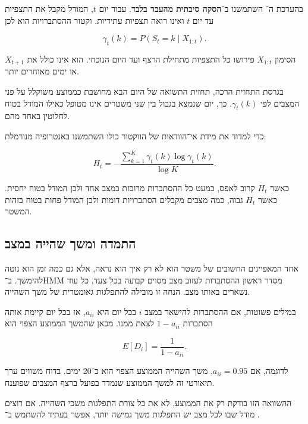 בהערכת ה־ השתמשנו ב־\textbf{הסקה סיבתית מהעבר בלבד}. עבור יום \(t\), המודל מקבל את התצפיות עד יום \(t\) ואינו רואה תצפיות עתידיות. וקטור ההסתברויות הוא לכן

\begin{equation}
\gamma_t(k)=P(S_t=k\mid X_{1:t}).
\end{equation}

הסימון \(X_{1:t}\) פירושו כל התצפיות מתחילת הרצף ועד היום הנוכחי. הוא אינו כולל את \(X_{t+1}\) או ימים מאוחרים יותר.

בגרסת התחזית הרכה, תחזית התשואה של היום הבא מחושבת כממוצע משוקלל על פני המצבים לפי \(\gamma_t(k)\). כך, יום שנמצא בגבול בין שני משטרים אינו מטופל כאילו המודל בטוח לחלוטין באחד מהם.

כדי למדוד את מידת אי־הוודאות של הווקטור כולו השתמשנו באנטרופיה מנורמלת:

\begin{equation}
H_t=-\frac{\sum_{k=1}^{K}\gamma_t(k)\log\gamma_t(k)}{\log K}.
\end{equation}

כאשר \(H_t\) קרוב לאפס, כמעט כל ההסתברות מרוכזת במצב אחד ולכן המודל בטוח יחסית. כאשר \(H_t\) גבוה, כמה מצבים מקבלים הסתברויות דומות ולכן המודל פחות בטוח בזהות המשטר.

\subsection{התמדה ומשך שהייה במצב}

אחד המאפיינים החשובים של משטר הוא לא רק איך הוא נראה, אלא גם כמה זמן הוא נוטה להימשך. ב־HMM מסדר ראשון ההסתברות לעזוב מצב מסוים קבועה בכל צעד, כל עוד נשארים באותו מצב. הנחה זו מובילה להתפלגות גאומטרית של משך השהייה.

במילים פשוטות, אם ההסתברות להישאר במצב \(i\) בכל יום היא \(a_{ii}\), אז בכל יום קיימת אותה הסתברות \(1-a_{ii}\) לצאת ממנו. מכאן שהמשך הממוצע הצפוי הוא

\begin{equation}
E[D_i]=\frac{1}{1-a_{ii}}.
\end{equation}

לדוגמה, אם \(a_{ii}=0.95\), משך השהייה הממוצע הצפוי הוא כ־20 ימים. בדוח משווים ערך תיאורטי זה למשך הממוצע שנמדד בפועל ברצף המצבים שפוענח.

ההשוואה הזו בודקת רק את הממוצע, לא את כל צורת התפלגות משכי השהייה. אם רוצים מודל שבו לכל מצב יש התפלגות משך גמישה יותר, אפשר בעתיד להשתמש ב־ \cite{bulla2006application}.

